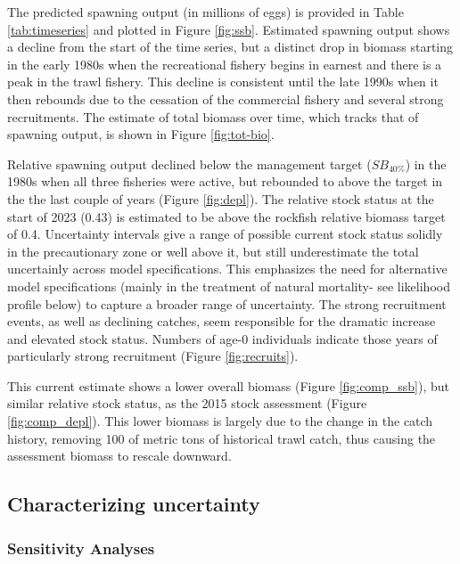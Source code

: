 \documentclass[11pt,
  english,
  letterpaper,
]{article}
\begin{document}
The predicted spawning output (in millions of eggs) is provided in Table \ref{tab:timeseries} and plotted in Figure \ref{fig:ssb}. Estimated spawning output shows a decline from the start of the time series, but a distinct drop in biomass starting in the early 1980s when the recreational fishery begins in earnest and there is a peak in the trawl fishery. This decline is consistent until the late 1990s when it then rebounds due to the cessation of the commercial fishery and several strong recruitments. The estimate of total biomass over time, which tracks that of spawning output, is shown in Figure \ref{fig:tot-bio}.

Relative spawning output declined below the management target (\(SB_{40\%}\)) in the 1980s when all three fisheries were active, but rebounded to above the target in the the last couple of years (Figure \ref{fig:depl}). The relative stock status at the start of 2023 (0.43) is estimated to be above the rockfish relative biomass target of 0.4. Uncertainty intervals give a range of possible current stock status solidly in the precautionary zone or well above it, but still underestimate the total uncertainly across model specifications. This emphasizes the need for alternative model specifications (mainly in the treatment of natural mortality- see likelihood profile below) to capture a broader range of uncertainty. The strong recruitment events, as well as declining catches, seem responsible for the dramatic increase and elevated stock status. Numbers of age-0 individuals indicate those years of particularly strong recruitment (Figure \ref{fig:recruits}).

This current estimate shows a lower overall biomass (Figure \ref{fig:comp_ssb}), but similar relative stock status, as the 2015 stock assessment (Figure \ref{fig:comp_depl}). This lower biomass is largely due to the change in the catch history, removing 100 of metric tons of historical trawl catch, thus causing the assessment biomass to rescale downward.

\hypertarget{characterizing-uncertainty}{%
\subsection{Characterizing uncertainty}\label{characterizing-uncertainty}}

\hypertarget{sensitivity-analyses}{%
\subsubsection{Sensitivity Analyses}\label{sensitivity-analyses}}
\end{document}
